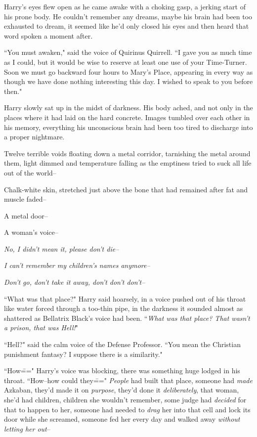 

\hplettrineextrapara
Harry's eyes flew open as he came awake with a choking gasp, a jerking start of his prone body. He couldn't remember any dreams, maybe his brain had been too exhausted to dream, it seemed like he'd only closed his eyes and then heard that word spoken a moment after.

``You must awaken," said the voice of Quirinus Quirrell. ``I gave you as much time as I could, but it would be wise to reserve at least one use of your Time-Turner. Soon we must go backward four hours to Mary's Place, appearing in every way as though we have done nothing interesting this day. I wished to speak to you before then."

Harry slowly sat up in the midst of darkness. His body ached, and not only in the places where it had laid on the hard concrete. Images tumbled over each other in his memory, everything his unconscious brain had been too tired to discharge into a proper nightmare.

Twelve terrible voids floating down a metal corridor, tarnishing the metal around them, light dimmed and temperature falling as the emptiness tried to suck all life out of the world\---

Chalk-white skin, stretched just above the bone that had remained after fat and muscle faded\---

A metal door\---

A woman's voice\---

\emph{No, I didn't mean it, please don't die\---}

\emph{I can't remember my children's names anymore\---}

\emph{Don't go, don't take it away, don't don't don't\---}

``What was that place?" Harry said hoarsely, in a voice pushed out of his throat like water forced through a too-thin pipe, in the darkness it sounded almost as shattered as Bellatrix Black's voice had been. ``\emph{What was that place? That wasn't a prison, that was \emph{Hell!}}"

``Hell?" said the calm voice of the Defense Professor. ``You mean the Christian punishment fantasy? I suppose there is a similarity."

``How\===" Harry's voice was blocking, there was something huge lodged in his throat. ``How\---how could they\===" \emph{People} had built that place, someone had \emph{made} Azkaban, they'd made it on \emph{purpose}, they'd done it \emph{deliberately}, that woman, she'd had children, children she wouldn't remember, some judge had \emph{decided} for that to happen to her, someone had needed to \emph{drag} her into that cell and lock its door while she screamed, someone fed her every day and walked away \emph{without letting her out}\---

